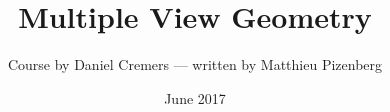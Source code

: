 \documentclass[11pt,a4paper]{article}
\begin{document}
\title{Multiple View Geometry}
\author{Course by Daniel Cremers --- written by Matthieu Pizenberg}
\date{June 2017}

\maketitle

\tableofcontents
\clearpage

\begin{multicols}{2}


\clearpage



\end{multicols}
\end{document}
